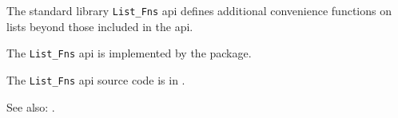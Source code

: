 
The standard library {\tt List\_Fns} api defines additional convenience functions on lists beyond those included in the  api.

The {\tt List\_Fns} api is implemented by the  package.

The {\tt List\_Fns} api source code is in .

See also: .





